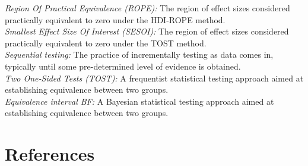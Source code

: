 \documentclass[
  english,
  man,floatsintext]{apa6}
\begin{document}
\emph{Region Of Practical Equivalence (ROPE):} The region of effect sizes considered practically equivalent to zero under the HDI-ROPE method.\\
\emph{Smallest Effect Size Of Interest (SESOI):} The region of effect sizes considered practically equivalent to zero under the TOST method.\\
\emph{Sequential testing:} The practice of incrementally testing as data comes in, typically until some pre-determined level of evidence is obtained.\\
\emph{Two One‐Sided Tests (TOST):} A frequentist statistical testing approach aimed at establishing equivalence between two groups.\\
\emph{Equivalence interval BF:} A Bayesian statistical testing approach aimed at establishing equivalence between two groups.\\

\newpage

\hypertarget{references}{%
\section{References}\label{references}}

\begingroup
\setlength{\parindent}{-0.5in}
\setlength{\leftskip}{0.5in}
\end{document}
